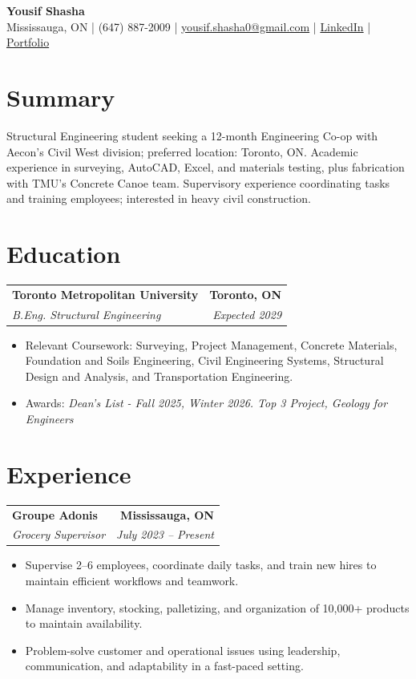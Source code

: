 \documentclass[11pt]{article}
\newcommand{\contact}[1]{\small #1}
\newcommand{\entry}[4]{%
  \begin{tabularx}{\textwidth}{X r}
    \textbf{#1} & \textbf{#2} \\
    \textit{#3} & \textit{#4} \\
  \end{tabularx}\vspace{-2pt}
}
\newcommand{\tightItem}[1]{\item \small #1}
\begin{document}
\begin{center}
{\LARGE \textbf{Yousif Shasha}}\\[4pt]
\contact{Mississauga, ON \;\;|\;\; (647) 887-2009 \;\;|\;\;
\href{mailto:yousif.shasha0@gmail.com}{yousif.shasha0@gmail.com} \;\;|\;\;
\href{https://www.linkedin.com/in/yousif-shasha-177412375}{LinkedIn}} 
\;\;|\;\;
\href{https://yousifshasha.github.io/Yousif-Shasha.github.io/}
{Portfolio}

\end{center}

\vspace{-4pt}

\section*{Summary}
\small{
Structural Engineering student seeking a 12-month Engineering Co-op with Aecon's Civil West division; preferred location: Toronto, ON. Academic experience in surveying, AutoCAD, Excel, and materials testing, plus fabrication with TMU's Concrete Canoe team. Supervisory experience coordinating tasks and training employees; interested in heavy civil construction.}

\section*{Education}
\entry
{Toronto Metropolitan University}{Toronto, ON}
{B.Eng. Structural Engineering}{Expected 2029}
\begin{itemize}
  \tightItem{Relevant Coursework: Surveying, Project Management, Concrete Materials, Foundation and Soils Engineering, Civil Engineering Systems, Structural Design and Analysis, and Transportation Engineering.}
  \tightItem{Awards: \textit{Dean's List - Fall 2025, Winter 2026. Top 3 Project, Geology for Engineers }}
\end{itemize}
\vspace{2pt}


\section*{Experience}
\entry
{Groupe Adonis}{Mississauga, ON}
{Grocery Supervisor }{July 2023 -- Present}
\begin{itemize}
  \tightItem{Supervise 2--6 employees, coordinate daily tasks, and train new hires to maintain efficient workflows and teamwork. }
  \tightItem{Manage inventory, stocking, palletizing, and organization of 10,000+ products to maintain availability.}
  \tightItem{Problem-solve customer and operational issues using leadership, communication,  and adaptability in a fast-paced setting.
  }
  
\end{itemize}
\end{document}
